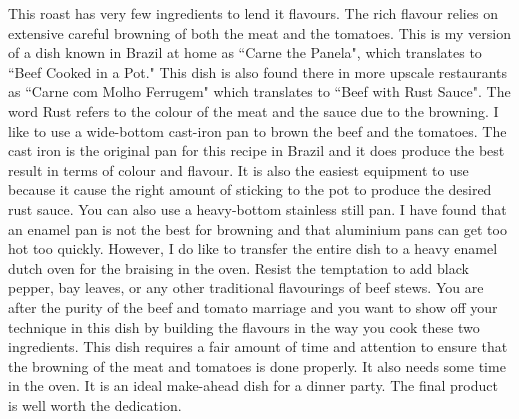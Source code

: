 \documentclass[11pt,letterpaper]{article}
\begin{document}


This roast has very few ingredients to lend it flavours. The rich flavour relies on extensive careful browning of both the meat and the tomatoes. This is my version of a dish known in Brazil at home as ``Carne the Panela", which translates to ``Beef Cooked in a Pot." This dish is also found there in more upscale restaurants as ``Carne com Molho Ferrugem" which translates to ``Beef with Rust Sauce". The word Rust refers to the colour of the meat and the sauce due to the browning. I like to use a wide-bottom cast-iron pan to brown the beef and the tomatoes. The cast iron is the original pan for this recipe in Brazil and it does produce the best result in terms of colour and flavour. It is also the easiest equipment to use because it cause the right amount of sticking to the pot to produce the desired rust sauce. You can also use a heavy-bottom stainless still pan. I have found that an enamel pan is not the best for browning and that aluminium pans can get too hot too quickly. However, I do like to transfer the entire dish to a heavy enamel dutch oven for the braising in the oven. Resist the temptation to add black pepper, bay leaves, or any other traditional flavourings of beef stews. You are after the purity of the beef and tomato marriage and you want to show off your technique in this dish by building the flavours in the way you cook these two ingredients. This dish requires a fair amount of time and attention to ensure that the browning of the meat and tomatoes is done properly. It also needs some time in the oven. It is an ideal make-ahead dish for a dinner party. The final product is well worth the dedication.
 
\end{document}

